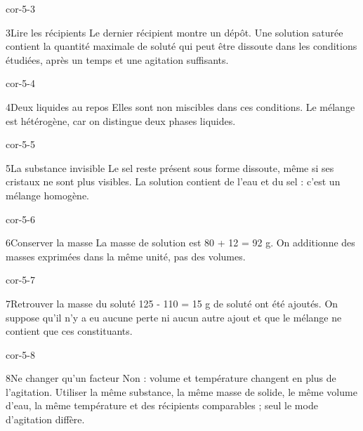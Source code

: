 \documentclass[12pt,twoside,openany]{book}
\begin{document}
\begin{blocLivre}{cor-5-3}
\begin{corrige}{3}{Lire les récipients}
Le dernier récipient montre un dépôt. Une solution saturée contient la quantité maximale de soluté qui peut être dissoute dans les conditions étudiées, après un temps et une agitation suffisants.\par
{}
\end{corrige}\end{blocLivre}
\begin{blocLivre}{cor-5-4}
\begin{corrige}{4}{Deux liquides au repos}
Elles sont non miscibles dans ces conditions. Le mélange est hétérogène, car on distingue deux phases liquides.\par
{}
\end{corrige}\end{blocLivre}
\begin{blocLivre}{cor-5-5}
\begin{corrige}{5}{La substance invisible}
Le sel reste présent sous forme dissoute, même si ses cristaux ne sont plus visibles. La solution contient de l’eau et du sel : c’est un mélange homogène.\par
\end{corrige}\end{blocLivre}
\begin{blocLivre}{cor-5-6}
\begin{corrige}{6}{Conserver la masse}
La masse de solution est 80 + 12 = 92 g. On additionne des masses exprimées dans la même unité, pas des volumes.\par
\end{corrige}\end{blocLivre}
\begin{blocLivre}{cor-5-7}
\begin{corrige}{7}{Retrouver la masse du soluté}
125 - 110 = 15 g de soluté ont été ajoutés. On suppose qu’il n’y a eu aucune perte ni aucun autre ajout et que le mélange ne contient que ces constituants.\par
\end{corrige}\end{blocLivre}
\begin{blocLivre}{cor-5-8}
\begin{corrige}{8}{Ne changer qu’un facteur}
Non : volume et température changent en plus de l’agitation. Utiliser la même substance, la même masse de solide, le même volume d’eau, la même température et des récipients comparables ; seul le mode d’agitation diffère.\par
\end{corrige}\end{blocLivre}
\end{document}
